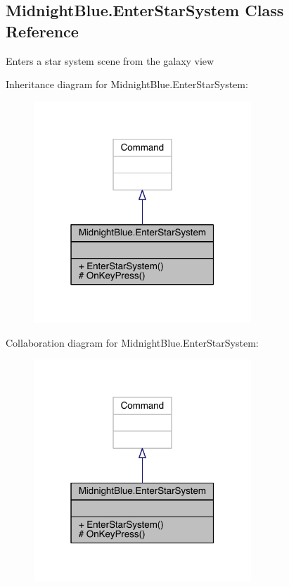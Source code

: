 \hypertarget{class_midnight_blue_1_1_enter_star_system}{}\subsection{Midnight\+Blue.\+Enter\+Star\+System Class Reference}
\label{class_midnight_blue_1_1_enter_star_system}


Enters a star system scene from the galaxy view  




Inheritance diagram for Midnight\+Blue.\+Enter\+Star\+System\+:\nopagebreak
\begin{figure}[H]
\begin{center}
\leavevmode
\includegraphics[width=232pt]{class_midnight_blue_1_1_enter_star_system__inherit__graph}
\end{center}
\end{figure}


Collaboration diagram for Midnight\+Blue.\+Enter\+Star\+System\+:\nopagebreak
\begin{figure}[H]
\begin{center}
\leavevmode
\includegraphics[width=232pt]{class_midnight_blue_1_1_enter_star_system__coll__graph}
\end{center}
\end{figure}
